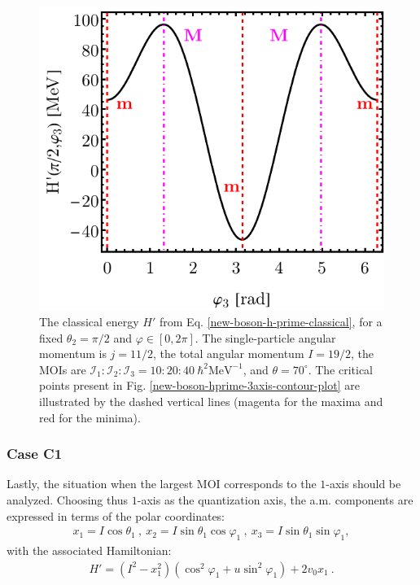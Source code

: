 \begin{figure}
    \begin{center}
        \includegraphics[scale=0.8]{Chapters/Figures/New-Boson-Classical-H-3-axis-varphi-plot.pdf}
        \caption{The classical energy $H'$ from Eq. \ref{new-boson-h-prime-classical}, for a fixed $\theta_2=\pi/2$ and $\varphi\in[0,2\pi]$. The single-particle angular momentum is $j=11/2$, the total angular momentum $I=19/2$, the MOIs are $\mathcal{I}_1:\mathcal{I}_2:\mathcal{I}_3=10:20:40\ \hbar^2\text{MeV}^{-1}$, and $\theta=70^\circ$. The critical points present in Fig. \ref{new-boson-hprime-3axis-contour-plot} are illustrated by the dashed vertical lines (magenta for the maxima and red for the minima).}
        \label{new-boson-hprime-3axis-varphi-plot}
    \end{center}
\end{figure}

\subsubsection*{Case C1}

Lastly, the situation when the largest MOI corresponds to the $1$-axis should be analyzed. Choosing thus $1$-axis as the quantization axis, the a.m. components are expressed in terms of the polar coordinates:
\begin{align}
    x_1=I\cos\theta_1\ ,\ x_2=I\sin\theta_1\cos\varphi_1\ ,\ x_3=I\sin\theta_1\sin\varphi_1,
    \label{polar-coordinates-case-c1}
\end{align}
with the associated Hamiltonian:
\begin{align}
    H'=\left(I^2-x_1^2\right)\left(\cos^2\varphi_1+u\sin^2\varphi_1\right)+2v_0x_1\ .
    \label{classical-energy-new-boson-1-axis}
\end{align}

